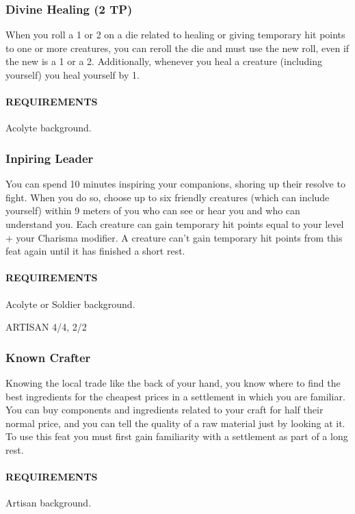     \subsubsection{Divine Healing (2 TP)} \label{feat::divinehealing}
        When you roll a 1 or 2 on a die related to healing or giving temporary hit points to one or more creatures, you can reroll the die and must use the new roll, even if the new is a 1 or a 2.
        Additionally, whenever you heal a creature (including yourself) you heal yourself by 1.
        \paragraph{REQUIREMENTS} Acolyte background.

    \subsubsection{Inpiring Leader} \label{feat::inspiringleader}
        You can spend 10 minutes inspiring your companions, shoring up their resolve to fight.
        When you do so, choose up to six friendly creatures (which can include yourself) within 9 meters of you who can see or hear you and who can understand you.
        Each creature can gain temporary hit points equal to your level + your Charisma modifier.
        A creature can't gain temporary hit points from this feat again until it has finished a short rest.
        \paragraph{REQUIREMENTS} Acolyte or Soldier background.

ARTISAN 4/4, 2/2
    \subsubsection{Known Crafter} \label{feat::knowncrafter}
        Knowing the local trade like the back of your hand, you know where to find the best ingredients for the cheapest prices in a settlement in which you are familiar.
        You can buy components and ingredients related to your craft for half their normal price, and you can tell the quality of a raw material just by looking at it.
        To use this feat you must first gain familiarity with a settlement as part of a long rest.
        \paragraph{REQUIREMENTS} Artisan background.

